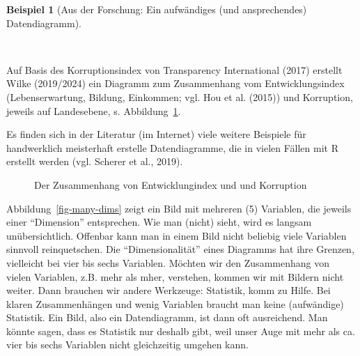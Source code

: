 \documentclass[
  letterpaper,
  twoside,
  open=any]{scrbook}
\theoremstyle{definition}
\theoremstyle{definition}
\theoremstyle{definition}
\newtheorem{example}{Beispiel}[chapter]
\theoremstyle{remark}
\begin{document}
\begin{example}[Aus der Forschung: Ein aufwändiges (und ansprechendes)
Datendiagramm]\protect\hypertarget{exm-datendiagramm}{}\label{exm-datendiagramm}

~

Auf Basis des Korruptionsindex von Transparency International (2017)
erstellt Wilke (2019/2024) ein Diagramm zum Zusammenhang vom
Entwicklungsindex (Lebenserwartung, Bildung, Einkommen; vgl. Hou et al.
(2015)) und Korruption, jeweils auf Landesebene, s.
Abbildung~\ref{fig-develop-corrupt}.

Es finden sich in der Literatur (im Internet) viele weitere Beispiele
für handwerklich meisterhaft erstelle Datendiagramme, die in vielen
Fällen mit R erstellt werden (vgl. Scherer et al., 2019).

\begin{figure}


\caption{\label{fig-develop-corrupt}Der Zusammenhang von
Entwicklungindex und und Korruption}

\end{figure}%

\end{example}

Abbildung~\ref{fig-many-dims} zeigt ein Bild mit mehreren (5) Variablen,
die jeweils einer \enquote{Dimension} entsprechen. Wie man (nicht)
sieht, wird es langsam unübersichtlich. Offenbar kann man in einem Bild
nicht beliebig viele Variablen sinnvoll reinquetschen. Die
\enquote{Dimensionalität} eines Diagramms hat ihre Grenzen, vielleicht
bei vier bis sechs Variablen. Möchten wir den Zusammenhang von vielen
Variablen, z.B. mehr als mher, verstehen, kommen wir mit Bildern nicht
weiter. Dann brauchen wir andere Werkzeuge: Statistik, komm zu Hilfe.
Bei klaren Zusammenhängen und wenig Variablen braucht man keine
(aufwändige) Statistik. Ein Bild, also ein Datendiagramm, ist dann oft
ausreichend. Man könnte sagen, dass es Statistik nur deshalb gibt, weil
unser Auge mit mehr als ca. vier bis sechs Variablen nicht gleichzeitig
umgehen kann.
\end{document}
